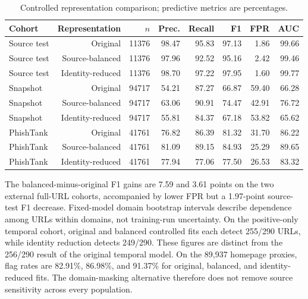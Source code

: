\documentclass[10pt]{article}
\newenvironment{bluechange}{\color{black}}{}
\begin{document}
\begin{table}[ht]
\centering\color{black}\small
\caption{Controlled representation comparison; predictive metrics are percentages.}

\begin{tabular}{lrrrrrrr}
\toprule
Cohort & Representation & $n$ & Prec. & Recall & F1 & FPR & AUC \\
\midrule
Source test & Original & 11376 & 98.47 & 95.83 & 97.13 & 1.86 & 99.66 \\
Source test & Source-balanced & 11376 & 97.96 & 92.52 & 95.16 & 2.42 & 99.46 \\
Source test & Identity-reduced & 11376 & 98.70 & 97.22 & 97.95 & 1.60 & 99.77 \\
Snapshot & Original & 94717 & 54.21 & 87.27 & 66.87 & 59.40 & 66.28 \\
Snapshot & Source-balanced & 94717 & 63.06 & 90.91 & 74.47 & 42.91 & 76.72 \\
Snapshot & Identity-reduced & 94717 & 55.81 & 84.37 & 67.18 & 53.82 & 65.62 \\
PhishTank & Original & 41761 & 76.82 & 86.39 & 81.32 & 31.70 & 86.22 \\
PhishTank & Source-balanced & 41761 & 81.09 & 89.15 & 84.93 & 25.29 & 89.65 \\
PhishTank & Identity-reduced & 41761 & 77.94 & 77.06 & 77.50 & 26.53 & 83.32 \\
\bottomrule
\end{tabular}
\end{table}

\begin{bluechange}
The balanced-minus-original F1 gains are 7.59 and 3.61 points on the two external full-URL cohorts, accompanied by lower FPR but a 1.97-point source-test F1 decrease. Fixed-model domain bootstrap intervals describe dependence among URLs within domains, not training-run uncertainty. On the positive-only temporal cohort, original and balanced controlled fits each detect 255/290 URLs, while identity reduction detects 249/290. These figures are distinct from the 256/290 result of the original temporal model. On the 89,937 homepage proxies, flag rates are 82.91\%, 86.98\%, and 91.37\% for original, balanced, and identity-reduced fits. The domain-masking alternative therefore does not remove source sensitivity across every population.
\end{bluechange}
\end{document}
